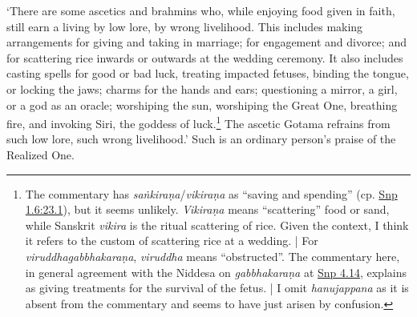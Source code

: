 \documentclass[12pt,openany]{book}%
\begin{document}
‘There are some ascetics and brahmins who, while enjoying food given in faith, still earn a living by low lore, by wrong livelihood. This includes making arrangements for giving and taking in marriage; for engagement and divorce; and for scattering rice inwards or outwards at the wedding ceremony. It also includes casting spells for good or bad luck, treating impacted fetuses, binding the tongue, or locking the jaws; charms for the hands and ears; questioning a mirror, a girl, or a god as an oracle; worshiping the sun, worshiping the Great One, breathing fire, and invoking Siri, the goddess of luck.\footnote{The commentary has \textit{\textsanskrit{saṅkiraṇa}}/\textit{\textsanskrit{vikiraṇa}} as “saving and spending” (cp. \href{https://suttacentral.net/snp1.6/en/sujato\#23.1}{Snp 1.6:23.1}), but it seems unlikely. \textit{\textsanskrit{Vikiraṇa}} means “scattering” food or sand, while Sanskrit  \textit{vikira} is the ritual scattering of rice. Given the context, I think it refers to the custom of scattering rice at a wedding. | For \textit{\textsanskrit{viruddhagabbhakaraṇa}}, \textit{viruddha} means “obstructed”. The commentary here, in general agreement with the Niddesa on \textit{\textsanskrit{gabbhakaraṇa}} at \href{https://suttacentral.net/snp4.14/en/sujato}{Snp 4.14}, explains as giving treatments for the survival of the fetus. | I omit \textit{hanujappana} as it is absent from the commentary and seems to have just arisen by confusion. } The ascetic Gotama refrains from such low lore, such wrong livelihood.’ Such is an ordinary person’s praise of the Realized One. 
\end{document}
